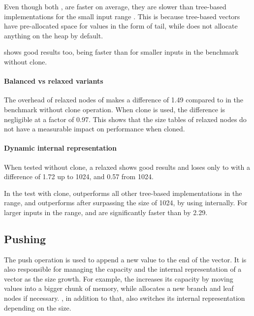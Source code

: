 Even though both \stdvec{}, \pvec{} are faster on average, they are slower than tree-based implementations for the small input range \range{[10, 100]}. This is because tree-based vectors have pre-allocated space for values in the form of tail, while \stdvec{} does not allocate anything on the heap by default. 

\imrsvec{} shows good results too, being faster than \rrbvec{} for smaller inputs in the benchmark without clone. 

\paragraph{Balanced vs relaxed variants}
The overhead of relaxed nodes of \rrbtree{} makes a difference of 1.49 compared to \rbtree{} in the benchmark without clone operation. When clone is used, the difference is negligible at a factor of 0.97. This shows that the size tables of relaxed nodes do not have a measurable impact on performance when cloned.

\paragraph{Dynamic internal representation}
When tested without clone, a relaxed \pvec{} shows good results and loses only to \stdvec{} with a difference of 1.72 up to 1024, and 0.57 from 1024.

In the test with clone, \pvec{} outperforms all other tree-based implementations in the \range{[100, \kilo{1}]} range, and outperforms \stdvec{} after surpassing the size of 1024, by using \rrbvec{} internally. For larger inputs in the  range, \pvec{} and \rrbvec{} are significantly faster than \stdvec{} by 2.29. 

\subsection{Pushing}

The push operation is used to append a new value to the end of the vector. It is also responsible for managing the capacity and the internal representation of a vector as the size growth. For example, the \stdvec{} increases its capacity by moving values into a bigger chunk of memory, while \rrbvec{} allocates a new branch and leaf nodes if necessary. \pvec{}, in addition to that, also switches its internal representation depending on the size.


